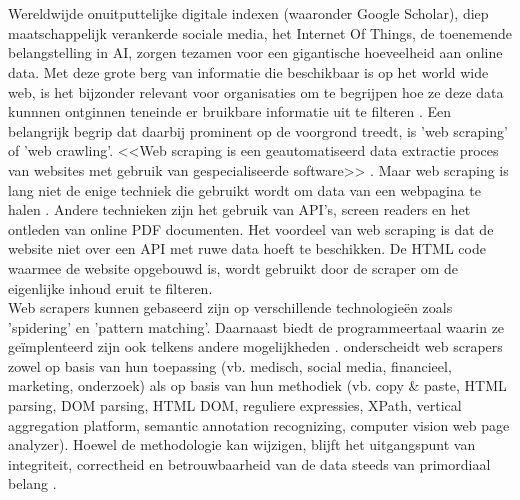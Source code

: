 \chapter{}%
\label{ch:stand-van-zaken}


Wereldwijde onuitputtelijke digitale indexen (waaronder Google Scholar), diep maatschappelijk verankerde sociale media, het Internet Of Things, de toenemende belangstelling in AI, zorgen tezamen voor een gigantische hoeveelheid aan online data. Met deze grote berg van informatie die beschikbaar is op het world wide web, is het bijzonder relevant voor organisaties om te begrijpen hoe ze deze data kunnnen ontginnen teneinde er bruikbare informatie uit te filteren \autocite{Lotfi2021}. Een belangrijk begrip dat daarbij prominent op de voorgrond treedt, is 'web scraping' of 'web crawling'. <<Web scraping is een geautomatiseerd data extractie proces van websites met gebruik van gespecialiseerde software>> \autocite{Bhatt2023}. Maar web scraping is lang niet de enige techniek die gebruikt wordt om data van een webpagina te halen \autocite{Gray2012}. Andere technieken zijn het gebruik van API's, screen readers en het ontleden van online PDF documenten. Het voordeel van web scraping is dat de website niet over een API met ruwe data hoeft te beschikken. De HTML code waarmee de website opgebouwd is, wordt gebruikt door de scraper om de eigenlijke inhoud eruit te filteren.\\
Web scrapers kunnen gebaseerd zijn op verschillende technologieën zoals 'spidering' en 'pattern matching'. Daarnaast biedt de programmeertaal waarin ze geïmplenteerd zijn ook telkens andere mogelijkheden \autocite{Bhatt2023}.
\textcite{Lotfi2021} onderscheidt web scrapers zowel op basis van hun toepassing (vb. medisch, social media, financieel, marketing, onderzoek) als op basis van hun  methodiek (vb. copy \& paste, HTML parsing, DOM parsing, HTML DOM, reguliere expressies, XPath, vertical aggregation platform, semantic annotation recognizing, computer vision web page analyzer). Hoewel de methodologie kan wijzigen, blijft het uitgangspunt van integriteit, correctheid en betrouwbaarheid van de data steeds van primordiaal belang \autocite{Lotfi2021}.
